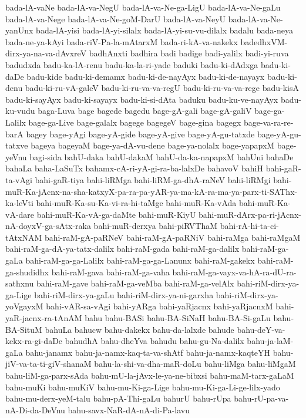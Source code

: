 {bada-lA-vaNe
bada-lA-va-NegU
bada-lA-va-Ne-ga-LigU
bada-lA-va-Ne-gaLu
bada-lA-va-Nege
bada-lA-va-Ne-goM-DarU
bada-lA-va-NeyU
bada-lA-va-Ne-yanUnx
bada-lA-yisi
bada-lA-yi-silalx
bada-lA-yi-su-vu-dilalx
badalu
bada-neya
bada-ne-ya-kAyi
bada-riV-Pa-la-mAtarxM
bada-ri-kA-va-nakekx
badedhxVM-dirx-ya-na-va-dAvxreV
badhAnxti
badhira
badi
badige
badi-yalilx
badi-yi-ruva
badudxda
badu-ka-lA-renu
badu-ka-la-ri-yade
baduki
badu-ki-dAdxga
badu-ki-daDe
badu-kide
badu-ki-demamx
badu-ki-de-nayAyx
badu-ki-de-nayayx
badu-ki-denu
badu-ki-ru-vA-galeV
badu-ki-ru-va-va-regU
badu-ki-ru-va-va-rege
badu-kisA
badu-ki-sayAyx
badu-ki-sayayx
badu-ki-si-dAta
baduku
badu-ku-ve-nayAyx
badu-ku-vudu
baga-Luva
bage
bagede
bagedu
bage-gA-gali
bage-gA-galiV
bage-ga-Lalilx
bage-ga-Live
bage-galalx
bagege
bagegeV
bage-gina
bagegx
bage-va-ra-re-barA
bagey
bage-yAgi
bage-yA-gide
bage-yA-give
bage-yA-gu-tatxde
bage-yA-gu-tatxve
bageya
bageyaM
bage-ya-dA-vu-dene
bage-ya-nolalx
bage-yapapxM
bage-yeVnu
bagi-sida
bahU-daka
bahU-dakaM
bahU-da-ka-napapxM
bahUni
bahaDe
bahaLa
baha-LaSuTx
bahamx-cA-ri-yA-gi-ra-ba-lalxDe
bahavoV
bahiH
bahi-gaR-ta-vAgi
bahi-gaR-tiya
bahi-liRMga
bahi-liRM-ga-dhA-raNeV
bahi-liRMgi
bahi-muR-Ka-jAcnx-na-sha-katxyX-pa-ra-pa-yAR-ya-ma-kA-ra-ma-ya-parx-ti-SAThx-ka-leVti
bahi-muR-Ka-su-Ka-vi-ra-hi-taMge
bahi-muR-Ka-vAda
bahi-muR-Ka-vA-dare
bahi-muR-Ka-vA-ga-daMte
bahi-muR-KiyU
bahi-muR-dArx-pa-ri-jAcnx-nA-doyxV-ga-sAtx-raka
bahi-muR-derxya
bahi-piRVThaM
bahi-rA-hi-ta-ci-tAtxNAM
bahi-raM-gA-paRNeV
bahi-raM-gA-paRNiV
bahi-raMga
bahi-raMgaM
bahi-raM-ga-dA-ya-tatx-dalilx
bahi-raM-gada
bahi-raM-ga-dalilx
bahi-raM-ga-gaLa
bahi-raM-ga-ga-Lalilx
bahi-raM-ga-ga-Lanunx
bahi-raM-gakekx
bahi-raM-ga-shudidhx
bahi-raM-gava
bahi-raM-ga-vaha
bahi-raM-ga-vayx-va-hA-ra-dU-ra-sathxnu
bahi-raM-gave
bahi-raM-ga-veMba
bahi-raM-ga-velAlx
bahi-riM-dirx-ya-ga-Lige
bahi-riM-dirx-ya-gaLu
bahi-riM-dirx-ya-ni-garxha
bahi-riM-dirx-ya-yoVgayxM
bahi-vAR-sa-vAgi
bahi-yARga
bahi-yaRjacnx
bahi-yaRjacnxM
bahi-yaR-jacnx-ra-tAnAM
bahu
bahu-BASi
bahu-BA-SiNaH
bahu-BA-Si-gaLu
bahu-BA-SituM
bahuLa
bahucw
bahu-dakekx
bahu-da-lalxde
bahude
bahu-deY-va-kekx-ra-gi-daDe
bahudhA
bahu-dheYva
bahudu
bahu-gu-Na-dalilx
bahu-ja-laM-gaLa
bahu-janamx
bahu-ja-namx-kaq-ta-va-shAtf
bahu-ja-namx-kaqteYH
bahu-jiV-va-ta-ti-giV-shanaM
bahu-la-shi-va-dha-maR-doLu
bahu-liMga
bahu-liMgaM
bahu-liM-ga-parx-sAda
bahu-mU-la-jAvx-le-ya-ne-bibxsi
bahu-maM-tarx-gaLaM
bahu-muKi
bahu-muKiV
bahu-mu-Ki-ga-Lige
bahu-mu-Ki-ga-Li-ge-lilx-yado
bahu-mu-derx-yeM-talu
bahu-pA-Thi-gaLu
bahurU
bahu-rUpa
bahu-rU-pa-va-nA-Di-da-DeVnu
bahu-savx-NaR-dA-nA-di-Pa-lavu
}
